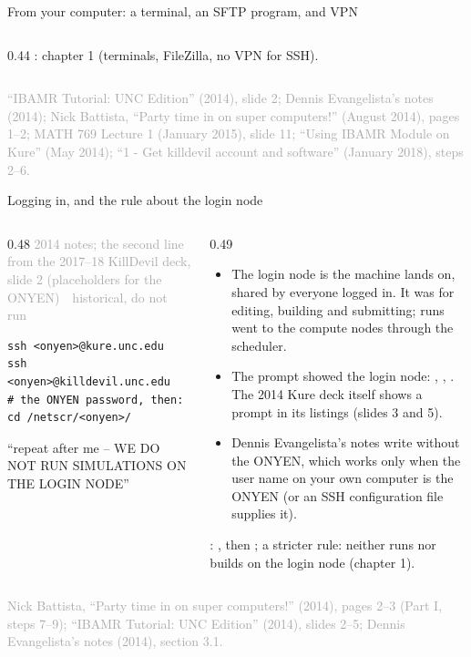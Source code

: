 \documentclass[aspectratio=169,11pt]{beamer}
\newcommand{\sourcecredit}[1]{\vfill\begin{flushright}\tiny\textcolor{DarkGray}{#1}\end{flushright}}
\newcommand{\hist}[1]{{\tiny\sffamily\textcolor{DarkGray}{#1\ \textbullet\ historical, do not run}}\par\nointerlineskip\vspace{0.3mm}}
\begin{document}
\begin{frame}{From your computer: a terminal, an SFTP program, and VPN}
\begin{columns}[T,onlytextwidth]
\begin{column}{0.44\textwidth}
\vspace{1mm}
\footnotesize {}: chapter 1 (terminals, FileZilla, no VPN for SSH).
\end{column}
\end{columns}
\sourcecredit{``IBAMR Tutorial: UNC Edition'' (2014), slide 2; Dennis Evangelista's notes (2014); Nick Battista, ``Party time in on super computers!'' (August 2014), pages 1--2; MATH 769 Lecture 1 (January 2015), slide 11; ``Using IBAMR Module on Kure'' (May 2014); ``1 - Get killdevil account and software'' (January 2018), steps 2--6.}
\end{frame}

\begin{frame}[fragile]{Logging in, and the rule about the login node}
\label{fr:kklogin}
\begin{columns}[T,onlytextwidth]
\begin{column}{0.48\textwidth}
\hist{2014 notes; the second line from the 2017--18 KillDevil deck, slide 2 (placeholders for the ONYEN)}
\begin{lstlisting}[style=hist]
ssh <onyen>@kure.unc.edu
ssh <onyen>@killdevil.unc.edu
# the ONYEN password, then:
cd /netscr/<onyen>/
\end{lstlisting}
\begin{homebox}
\footnotesize ``repeat after me -- WE DO NOT RUN SIMULATIONS ON THE LOGIN NODE''
\end{homebox}
\end{column}
\begin{column}{0.49\textwidth}
\scriptsize
\begin{itemize}\setlength{\itemsep}{2pt}
  \item The login node is the machine  lands on, shared by everyone logged in. It was for editing, building and submitting; runs went to the compute nodes through the scheduler.
  \item The prompt showed the login node: , , . The 2014 Kure deck itself shows a  prompt in its listings (slides 3 and 5).
  \item Dennis Evangelista's notes write  without the ONYEN, which works only when the user name on your own computer is the ONYEN (or an SSH configuration file supplies it).
\end{itemize}
\vspace{1mm}
: , then ; a stricter rule: neither runs nor builds on the login node (chapter 1).
\end{column}
\end{columns}
\sourcecredit{Nick Battista, ``Party time in on super computers!'' (2014), pages 2--3 (Part I, steps 7--9); ``IBAMR Tutorial: UNC Edition'' (2014), slides 2--5; Dennis Evangelista's notes (2014), section 3.1.}
\end{frame}
\end{document}

